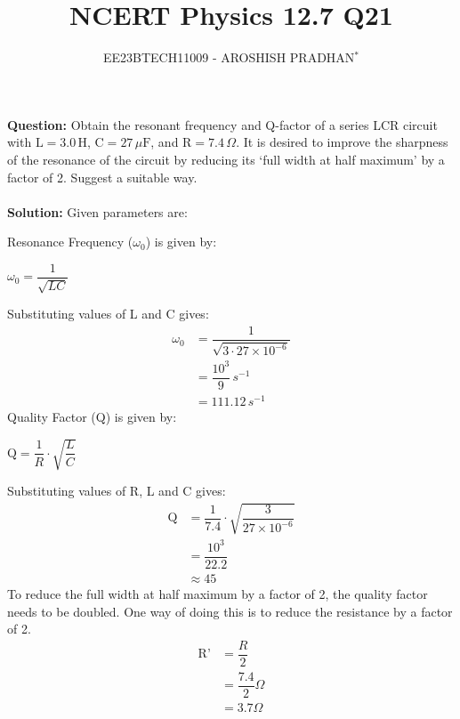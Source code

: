 \documentclass[journal,12pt,twocolumn]{IEEEtran}
\theoremstyle{remark}
\begin{document}

\vspace{3cm}

\title{NCERT Physics 12.7 Q21}
\author{EE23BTECH11009 - AROSHISH PRADHAN$^{*}$%
}
\maketitle
\newpage
\bigskip
\textbf{Question:} 
Obtain the resonant frequency and Q-factor of a series LCR circuit
with $\text{L} = 3.0\, \text{H}$, $\text{C} = 27\, \mu\text{F}$, and $\text{R} = 7.4\, \Omega$. It is desired to improve the
sharpness of the resonance of the circuit by reducing its `full width at half maximum' by a factor of 2. Suggest a suitable way.\\
\\
\textbf{Solution: }
Given parameters are:

\begin{table}[h]
    \centering
    \vspace{10 pt}
    \caption{Given Parameters}
    \label{tab:my_label}
\end{table}

\noindent Resonance Frequency ($\omega_0$) is given by:

\begin{center}
$\omega_0 = \dfrac{1}{\sqrt{LC}}$ 
\end{center}
Substituting values of L and C gives:
\begin{align}
\omega_0 &= \dfrac{1}{\sqrt{3\cdot27\times10^{-6}}}\\
&= \dfrac{10^{3}}{9}\, s^{-1}\\
&= 111.12\, s^{-1} 
\end{align}
Quality Factor (Q) is given by:
\begin{center}
    $\text{Q} = \dfrac{1}{R}\cdot\sqrt{\dfrac{L}{C}}$
\end{center}
Substituting values of R, L and C gives:
\begin{align}
    \text{Q} &= \dfrac{1}{7.4}\cdot\sqrt{\dfrac{3}{27\times10^{{-6}}}}  \\  
    &= \dfrac{10^{3}}{22.2}\\
    &\approx45
\end{align}
To reduce the full width at half maximum by a factor of 2, the quality factor needs to be doubled. One way of doing this is to reduce the resistance by a factor of 2.
\begin{align}
    \text{R'} &= \dfrac{R}{2}\\
    &= \dfrac{7.4}{2}\Omega\\
    &= 3.7\Omega
\end{align}
\end{document}
